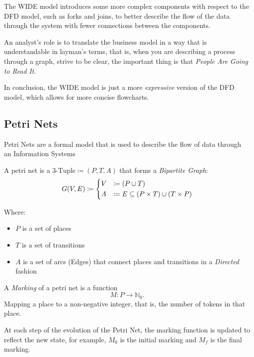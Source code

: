 \documentclass[openright, twoside, twocolumn, a4paper, 10pt]{report}
\begin{document}
The WIDE model introduces some more complex components with respect to the DFD model, such as forks and joins,
to better describe the flow of the data through the system with fewer connections between the components.

\begin{remark}
	An analyst's role is to translate the business model in a way that is understandable in layman's terms,
	that is, when you are describing a process through a graph, strive to be clear, the important thing
	is that \emph{People Are Going to Read It}.
\end{remark}

In conclusion, the WIDE model is just a more \emph{expressive} version of the DFD model, which
allows for more concise flowcharts.

\subsection{Petri Nets}

Petri Nets are a formal model that is used to describe the flow of data through an Information Systems

\begin{definition}\label{def:petri-nets}
	A petri net is a $\text{3-Tuple} \coloneqq  (P, T, A)$
	that forms a \emph{Bipartite Graph}:
	\[
		G(V, E) \coloneqq \begin{dcases}
			V & \coloneqq (P \cup T)                                  \\
			A & \coloneqq E \subseteq  (P \times T) \cup (T \times P)
		\end{dcases}\]

	Where:

	\begin{itemize}
		\item $P$ is a set of places
		\item $T$ is a set of transitions
		\item $A$ is a set of arcs (Edges) that connect places and transitions in a \emph{Directed} fashion
	\end{itemize}
\end{definition}

\begin{definition}[Marking]\label{def:marking}
	A \emph{Marking} of a petri net is a function
	\[
		M: P \to \mathbb{N}_0
		.\]
	Mapping a place to a non-negative integer, that is, the number of tokens in that place.

	At each step of the evolution of the Petri Net, the marking function is updated to reflect the new state, for example, $ M_0$ is the initial marking and $ M_f$ is the final marking.
\end{definition}
\end{document}
